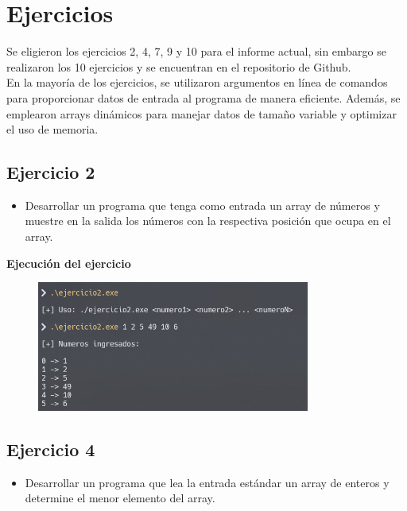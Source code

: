 \documentclass{article}
\begin{document}
\section{Ejercicios}
Se eligieron los ejercicios 2, 4, 7, 9 y 10 para el informe actual, sin embargo se realizaron los 10 ejercicios y se encuentran en el repositorio de Github. \\

En la mayoría de los ejercicios, se utilizaron argumentos en línea de comandos para proporcionar datos de entrada al programa de manera eficiente. Además, se emplearon arrays dinámicos para manejar datos de tamaño variable y optimizar el uso de memoria.

    \subsection{Ejercicio 2}
        \begin{itemize}
            \item Desarrollar un programa que tenga como entrada un array de números y muestre en la salida
            los números con la respectiva posición que ocupa en el array.
        \end{itemize}  
        
        

        \textbf{Ejecución del ejercicio}
        \begin{figure}[H]
        	\centering
         	\includegraphics[width=0.8\textwidth,keepaspectratio]{img/ejercicio2.png}
        \end{figure}
        
    
    \subsection{Ejercicio 4}
        \begin{itemize}
            \item Desarrollar un programa que lea la entrada estándar un array de enteros y determine el
            menor elemento del array.
        \end{itemize}
    
\end{document}
